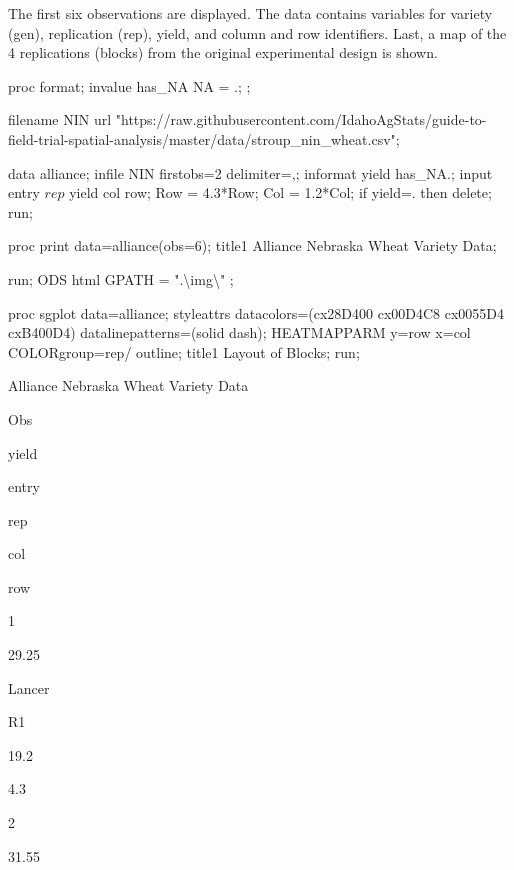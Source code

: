 \documentclass[
]{book}
\newenvironment{Shaded}{\begin{snugshade}}{\end{snugshade}}
\newcommand{\NormalTok}[1]{#1}
\begin{document}
The first six observations are displayed. The data contains variables for variety (gen), replication (rep), yield, and column and row identifiers. Last, a map of the 4 replications (blocks) from the original experimental design is shown.

\begin{Shaded}
\begin{Highlighting}[]
\NormalTok{proc format;}
\NormalTok{  invalue has\_NA}
\NormalTok{  \textquotesingle{}NA\textquotesingle{} = .;}
\NormalTok{;}

\NormalTok{filename NIN url "https://raw.githubusercontent.com/IdahoAgStats/guide{-}to{-}field{-}trial{-}spatial{-}analysis/master/data/stroup\_nin\_wheat.csv";}

\NormalTok{data alliance;}
\NormalTok{    infile NIN firstobs=2 delimiter=\textquotesingle{},\textquotesingle{};}
\NormalTok{    informat yield has\_NA.;}
\NormalTok{    input entry $   rep $   yield   col row;}
\NormalTok{    Row  = 4.3*Row;}
\NormalTok{    Col = 1.2*Col;}
\NormalTok{    if yield=. then delete;}
\NormalTok{run;}

\NormalTok{proc print data=alliance(obs=6);}
\NormalTok{title1 \textquotesingle{} Alliance Nebraska Wheat Variety Data\textquotesingle{};}

\NormalTok{run;}
\NormalTok{ODS html GPATH = ".\textbackslash{}img\textbackslash{}" ;}

\NormalTok{proc sgplot data=alliance;}
\NormalTok{    styleattrs datacolors=(cx28D400 cx00D4C8 cx0055D4 cxB400D4) datalinepatterns=(solid dash);}
\NormalTok{    HEATMAPPARM y=row x=col COLORgroup=rep/ outline; }
\NormalTok{title1 \textquotesingle{}Layout of Blocks\textquotesingle{};}
\NormalTok{run;}
\end{Highlighting}
\end{Shaded}

Alliance Nebraska Wheat Variety Data

Obs

yield

entry

rep

col

row

1

29.25

Lancer

R1

19.2

4.3

2

31.55
\end{document}
